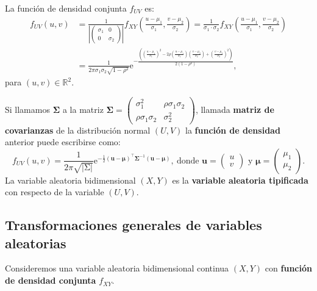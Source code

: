 \documentclass[
  letterpaper,
  DIV=11,
  numbers=noendperiod]{scrreprt}
\begin{document}
La función de densidad conjunta \(f_{UV}\) es: \[
\begin{array}{rl}
f_{UV}(u,v) & = \frac{1}{\left|\begin{pmatrix}\sigma_1 & 0\\ 0& \sigma_2\end{pmatrix}\right|} f_{XY}\left(\frac{u-\mu_1}{\sigma_1},\frac{v-\mu_2}{\sigma_2}\right)
=\frac{1}{\sigma_1\cdot \sigma_2}f_{XY}\left(\frac{u-\mu_1}{\sigma_1},\frac{v-\mu_2}{\sigma_2}\right)\\ & =
\frac{1}{2\pi\sigma_1\sigma_2\sqrt{1-\rho^2}}\mathrm{e}^{-\frac{\left(\left(\frac{u-\mu_1}{\sigma_1}\right)^2-2\rho \left(\frac{u-\mu_1}{\sigma_1}\right)\left(\frac{v-\mu_2}{\sigma_2}\right)+\left(\frac{v-\mu_2}{\sigma_2}\right)^2\right)}{2(1-\rho^2)}},
\end{array}
\] para \((u,v)\in\mathbb{R}^2\).

Si llamamos \(\mathbf{\Sigma}\) a la matriz
\(\mathbf{\Sigma}=\begin{pmatrix}\sigma_1^2 & \rho\sigma_1\sigma_2\\ \rho\sigma_1\sigma_2 & \sigma_2^2\end{pmatrix}\),
llamada \textbf{matriz de covarianzas} de la distribución normal
\((U,V)\) la \textbf{función de densidad} anterior puede escribirse
como: \[
f_{UV}(u,v)=\frac{1}{2\pi \sqrt{\left|\mathrm{\Sigma}\right|}}\mathrm{e}^{-\frac{1}{2}(\mathbf{u}-\mathbf{\mu})^\top \mathbf{\Sigma}^{-1}(\mathbf{u}-\mathbf{\mu})},\ \mbox{donde $\mathbf{u}=\begin{pmatrix}u \\ v\end{pmatrix}$ y $\mathbf{\mu}=\begin{pmatrix}\mu_1\\\mu_2\end{pmatrix}$.}
\] La variable aleatoria bidimensional \((X,Y)\) es la \textbf{variable
aleatoria tipificada} con respecto de la variable \((U,V)\).

\hypertarget{transformaciones-generales-de-variables-aleatorias}{%
\subsection{Transformaciones generales de variables
aleatorias}\label{transformaciones-generales-de-variables-aleatorias}}

Consideremos una variable aleatoria bidimensional continua \((X,Y)\) con
\textbf{función de densidad conjunta} \(f_{XY}\).
\end{document}
